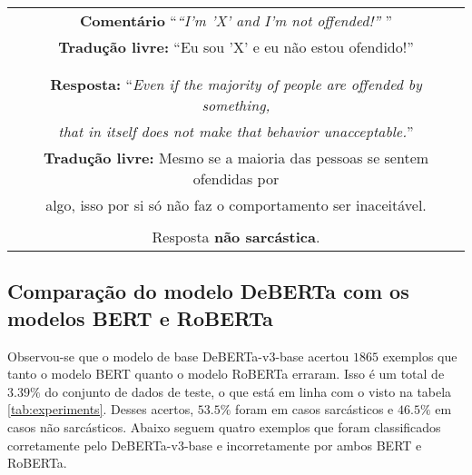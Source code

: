 \begin{center}
\begin{tabular}{|c|}

\hline

\textbf{Comentário} ``\textit{``I'm 'X' and I'm not offended!''} '' \\

\textbf{Tradução livre:} ``Eu sou 'X' e eu não estou ofendido!'' \\ \\

\hline

\\

\textbf{Resposta:} ``\textit{Even if the majority of people are offended by something,} \\
\textit{that in itself does not make that behavior unacceptable.}'' \\

\textbf{Tradução livre:} Mesmo se a maioria das pessoas se sentem ofendidas por \\
algo, isso por si só não faz o comportamento ser inaceitável. \\ \\

Resposta \textbf{não sarcástica}.

\\ \hline

\end{tabular}
\end{center}

\subsection{Comparação do modelo DeBERTa com os modelos BERT e RoBERTa}%
\label{sub:comparacao_do_modelo_deberta_com_os_modelos_bert_e_roberta}

Observou-se que o modelo de base DeBERTa-v3-base acertou $1865$ exemplos que
tanto o modelo BERT quanto o modelo RoBERTa erraram. Isso é um total de $3.39\%$
do conjunto de dados de teste, o que está em linha com o visto na tabela
\ref{tab:experiments}. Desses acertos, $53.5\%$ foram em casos sarcásticos e
$46.5\%$ em casos não sarcásticos. Abaixo seguem quatro exemplos que foram
classificados corretamente pelo DeBERTa-v3-base e incorretamente por ambos BERT
e RoBERTa. \jump

